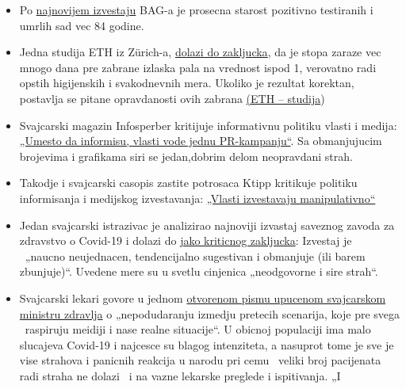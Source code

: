 \begin{itemize}
\tightlist
\item
  Po
  \href{https://www.bag.admin.ch/bag/de/home/krankheiten/ausbrueche-epidemien-pandemien/aktuelle-ausbrueche-epidemien/novel-cov/situation-schweiz-und-international.html}{najnovijem
  izvestaju} BAG-a je prosecna starost pozitivno testiranih i umrlih sad
  vec 84 godine.
\item
  Jedna studija ETH iz Zürich-a,
  \href{https://www.tagesanzeiger.ch/ansteckungsraten-flachten-bereits-vor-dem-lockdown-ab-809893127675}{dolazi
  do zakljucka}, da je stopa zaraze vec mnogo dana pre zabrane izlaska
  pala na vrednost ispod 1, verovatno radi opstih higijenskih i
  svakodnevnih mera. Ukoliko je rezultat korektan, postavlja se pitane
  opravdanosti ovih zabrana
  \href{https://bsse.ethz.ch/cevo/research/sars-cov-2/real-time-monitoring-in-switzerland.html}{(ETH
  -- studija})
\item
  Svajcarski magazin Infosperber kritijuje informativnu politiku vlasti
  i medija:
  \href{https://www.infosperber.ch/Artikel/Gesundheit/Corona-Statt-zu-informieren-fuhren-Behorden-eine-PR-Kampagne}{„Umesto
  da informisu, vlasti vode jednu PR-kampanju``}. Sa obmanjujucim
  brojevima i grafikama siri se jedan,dobrim delom neopravdani strah.
\item
  Takodje i svajcarski casopis zastite potrosaca Ktipp kritikuje
  politiku informisanja i medijskog izvestavanja:
  \href{https://www.ktipp.ch/artikel/artikeldetail/behoerden-informieren-irrefuehrend/}{„Vlasti
  izvestavaju manipulativno``}
\item
  Jedan svajcarski istrazivac je analizirao najnoviji izvastaj saveznog
  zavoda za zdravstvo o Covid-19 i dolazi do
  \href{https://covid-19-fakten.blogspot.com/2020/04/die-analyse-des-aktuellen.html}{jako
  kriticnog zakljucka}: Izvestaj je ~„naucno neujednacen, tendencijalno
  sugestivan i obmanjuje (ili barem zbunjuje)``. Uvedene mere su u
  svetlu cinjenica „neodgovorne i sire strah``.
\item
  Svajcarski lekari govore u jednom
  \href{https://www.rontalpraxis.ch/aktuelles}{otvorenom pismu upucenom
  svajcarskom ministru zdravlja} o „nepodudaranju izmedju pretecih
  scenarija, koje pre svega ~raspiruju meidiji i nase realne
  situacije``. U obicnoj populaciji ima malo slucajeva Covid-19 i
  najcesce su blagog intenziteta, a nasuprot tome je sve je vise
  strahova i panicnih reakcija u narodu pri cemu ~veliki broj pacijenata
  radi straha ne dolazi ~i na vazne lekarske preglede i ispitivanja. „I

\end{itemize}
